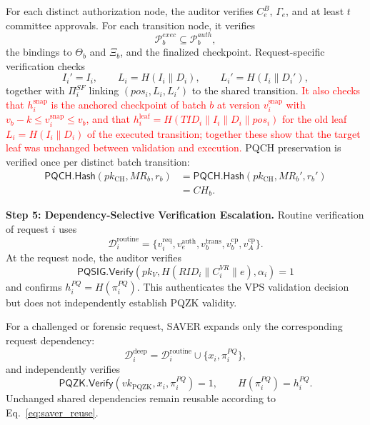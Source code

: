 \documentclass[lettersize,journal]{IEEEtran}
\begin{document}
For each distinct authorization node, the auditor verifies $C_e^B$,
$\Gamma_e$, and at least $t$ committee approvals. For each transition
node, it verifies
\begin{equation}
\mathcal{P}_b^{exec}\subseteq\mathcal{P}_b^{auth},
\end{equation}
the bindings to $\Theta_b$ and $\Xi_b$, and the finalized checkpoint.
Request-specific verification checks
\begin{equation}
I_i'=I_i,\qquad
L_i=H(I_i\parallel D_i),\qquad
L_i'=H(I_i\parallel D_i'),
\end{equation}
together with $\Pi_i^{SF}$ linking
$(pos_i,L_i,L_i')$ to the shared transition.
\textcolor{red}{It also checks that $h_i^{\mathrm{snap}}$ is the anchored
checkpoint of batch $b$ at version $v_i^{\mathrm{snap}}$ with
$v_b-k\le v_i^{\mathrm{snap}}\le v_b$, and that
$h_i^{\mathrm{leaf}}=H(TID_i\parallel I_i\parallel D_i\parallel pos_i)$
for the old leaf $L_i=H(I_i\parallel D_i)$ of the executed transition;
together these show that the target leaf was unchanged between validation
and execution.} PQCH preservation is
verified once per distinct batch transition:
\begin{equation}
\begin{aligned}
\mathsf{PQCH.Hash}(pk_{\mathrm{CH}},MR_b,r_b)
&=
\mathsf{PQCH.Hash}(pk_{\mathrm{CH}},MR_b',r_b')\\
&=CH_b.
\end{aligned}
\end{equation}

\medskip
\noindent\textbf{Step 5: Dependency-Selective Verification Escalation.}
Routine verification of request $i$ uses
\begin{equation}
\mathcal{D}_i^{\mathrm{routine}}
=
\{
v_i^{\mathrm{req}},
v_e^{\mathrm{auth}},
v_b^{\mathrm{trans}},
v_b^{\mathrm{cp}},
v_A^{\mathrm{cp}}
\}.
\end{equation}
At the request node, the auditor verifies
\begin{equation}
\mathsf{PQSIG.Verify}
\left(
pk_V,
H(RID_i\parallel C_i^{VR}\parallel e),
\alpha_i
\right)=1
\end{equation}
and confirms $h_i^{PQ}=H(\pi_i^{PQ})$. This authenticates the VPS
validation decision but does not independently establish PQZK validity.

For a challenged or forensic request, SAVER expands only the
corresponding request dependency:
\begin{equation}
\mathcal{D}_i^{\mathrm{deep}}
=
\mathcal{D}_i^{\mathrm{routine}}
\cup
\{x_i,\pi_i^{PQ}\},
\end{equation}
and independently verifies
\begin{equation}
\mathsf{PQZK.Verify}
(vk_{\mathrm{PQZK}},x_i,\pi_i^{PQ})=1,
\qquad
H(\pi_i^{PQ})=h_i^{PQ}.
\end{equation}
Unchanged shared dependencies remain reusable according to
Eq.~\eqref{eq:saver_reuse}.
\end{document}
